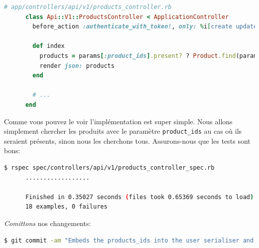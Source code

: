 \documentclass[]{report}
\begin{document}
    \begin{scriptsize}
      \begin{lstlisting}[language=ruby]
      # app/controllers/api/v1/products_controller.rb
      class Api::V1::ProductsController < ApplicationController
        before_action :authenticate_with_token!, only: %i[create update destroy]

        def index
          products = params[:product_ids].present? ? Product.find(params[:product_ids]) : Product.all
          render json: products
        end

        # ...
      end
      \end{lstlisting}
    \end{scriptsize}

    Comme vous pouvez le voir l'implémentation est super simple. Nous allons simplement chercher les produits avec le paramètre \verb|product_ids| au cas où ils seraient présents, sinon nous les cherchons tous. Assurons-nous que les tests sont bons:

    \begin{scriptsize}
      \begin{lstlisting}[language=bash]
      $ rspec spec/controllers/api/v1/products_controller_spec.rb
      ..................

      Finished in 0.35027 seconds (files took 0.65369 seconds to load)
      18 examples, 0 failures
      \end{lstlisting}
    \end{scriptsize}

    \textit{Comittons} nos changements:

    \begin{scriptsize}
      \begin{lstlisting}[language=bash]
      $ git commit -am "Embeds the products_ids into the user serialiser and fetches the correct products from the index action endpoint"
      \end{lstlisting}
    \end{scriptsize}
\end{document}
